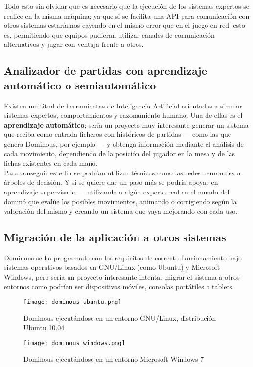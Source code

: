 Todo esto sin olvidar que es necesario que la ejecución de los sistemas expertos se realice en la misma máquina; ya que
si se facilita una API para comunicación con otros sistemas estaríamos cayendo en el mismo error que en el juego en red, 
esto es, permitiendo que equipos pudieran utilizar canales de comunicación alternativos y jugar con ventaja frente a otros.

\subsection{Analizador de partidas con aprendizaje automático o semiautomático}

Existen multitud de herramientas de Inteligencia Artificial orientadas a simular sistemas expertos, comportamientos 
y razonamiento humano. Una de ellas es el \textbf{aprendizaje automático}; sería un proyecto muy interesante generar un sistema
que reciba como entrada ficheros con históricos de partidas --- como las que genera Dominous, por ejemplo --- y obtenga
información mediante el análisis de cada movimiento, dependiendo de la posición del jugador en la mesa y de las fichas
existentes en cada mano. \\

Para conseguir este fin se podrían utilizar técnicas como las redes neuronales o árboles de decisión. Y si se quiere
dar un paso más se podría apoyar en aprendizaje supervisado --- utilizando a algún experto real en el mundo del dominó
que evalúe los posibles movimientos, animando o corrigiendo según la valoración del mismo y creando un sistema que
vaya mejorando con cada uso.

\subsection{Migración de la aplicación a otros sistemas}

Dominous se ha programado con los requisitos de correcto funcionamiento bajo sistemas operativos basados en GNU/Linux (como
Ubuntu) y Microsoft Windows, pero sería un proyecto interesante intentar migrar el sistema a otros entornos como podrían ser
dispositivos móviles, consolas portátiles o tablets. \\

\begin{figure}[h]
  \begin{center}
    \texttt{[image: dominous\_ubuntu.png]}
  \end{center}
  \caption{Dominous ejecutándose en un entorno GNU/Linux, distribución Ubuntu 10.04}
  \label{dominous_ubuntu}
\end{figure}


\begin{figure}[h]
  \begin{center}
    \texttt{[image: dominous\_windows.png]}
  \end{center}
  \caption{Dominous ejecutándose en un entorno Microsoft Windows 7}
  \label{dominous_windows}
\end{figure}

